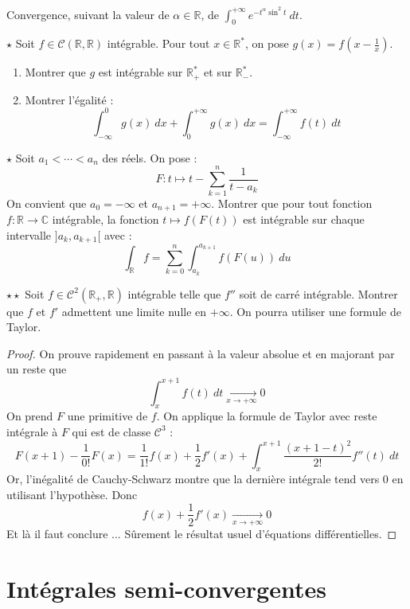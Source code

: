 \documentclass[french,a4paper]{article}
\newcommand{\R}{\mathbb{R}}
\newcommand{\C}{\mathbb{C}}
\newcommand{\st}{^*}
\theoremstyle{plain}
\theoremstyle{definition}
\theoremstyle{remark}
\begin{document}
\begin{ex}[Moulin.IG.46]{}
	Convergence, suivant la valeur de $\alpha\in\R$, de $\displaystyle\int_{0}^{+\infty}e^{-t^\alpha\sin^2 t}\ dt$.
\end{ex}

\begin{ex}[Moulin.IG.47]{$\star$}
	Soit $f\in\mathcal{C}(\R,\R)$ intégrable. Pour tout $x\in\R\st$, on pose $g(x)=\displaystyle f\left(x-\frac{1}{x}\right)$.
	\begin{enumerate}
		\item Montrer que $g$ est intégrable sur $\R_+\st$ et sur $\R_-\st$.
		\item Montrer l'égalité : $$\int_{-\infty}^{0}g(x)\ dx+\int_{0}^{+\infty}g(x)\ dx=\int_{-\infty}^{+\infty}f(t)\ dt$$
	\end{enumerate}
\end{ex}

\begin{ex}[Moulin.IG.48]{$\star$}
	Soit $a_1<\cdots<a_n$ des réels. On pose : $$F:t\mapsto t-\sum_{k=1}^{n}\frac{1}{t-a_k}$$ On convient que $a_0=-\infty$ et $a_{n+1}=+\infty$. Montrer que pour tout fonction $f:\R\to\C$ intégrable, la fonction $t\mapsto f(F(t))$ est intégrable sur chaque intervalle $]a_k,a_{k+1}[$ avec : $$\int_\R f=\sum_{k=0}^{n}\int_{a_k}^{a_{k+1}}f(F(u))\ du$$
\end{ex}

\begin{ex}[Moulin.IG.49]{$\star\star$}
	Soit $f\in\mathcal{C}^2(\R_+,\R)$ intégrable telle que $f''$ soit de carré intégrable. Montrer que $f$ et $f'$ admettent une limite nulle en $+\infty$. On pourra utiliser une formule de Taylor.
\end{ex}
\begin{proof}
	On prouve rapidement en passant à la valeur absolue et en majorant par un reste que $$\int_{x}^{x+1}f(t)\ dt\xrightarrow[x\to+\infty]{}0$$ On prend $F$ une primitive de $f$. On applique la formule de Taylor avec reste intégrale à $F$ qui est de classe $\mathcal{C}^3$ : $$F(x+1)-\frac{1}{0!}F(x)=\frac{1}{1!}f(x)+\frac{1}{2}f'(x)+\int_{x}^{x+1}\frac{(x+1-t)^2}{2!}f''(t)\ dt$$ Or, l'inégalité de Cauchy-Schwarz montre que la dernière intégrale tend vers $0$ en utilisant l'hypothèse. Donc $$f(x)+\frac{1}{2}f'(x)\xrightarrow[x\to+\infty]{}0$$ Et là il faut conclure ... Sûrement le résultat usuel d'équations différentielles.
\end{proof}

\section{Intégrales semi-convergentes}
\end{document}
